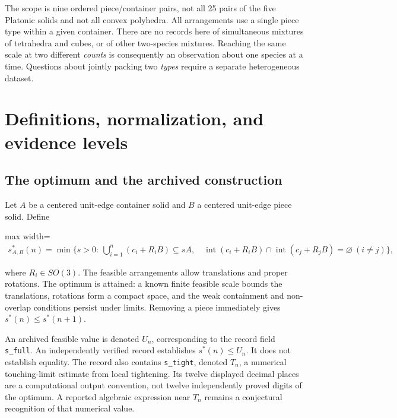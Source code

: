 \documentclass[11pt,a4paper]{article}
\begin{document}
The scope is nine ordered piece/container pairs, not all 25 pairs of the five Platonic solids and not all convex polyhedra. All arrangements use a single piece type within a given container. There are no records here of simultaneous mixtures of tetrahedra and cubes, or of other two-species mixtures. Reaching the same scale at two different \emph{counts} is consequently an observation about one species at a time. Questions about jointly packing two \emph{types} require a separate heterogeneous dataset.

\section{Definitions, normalization, and evidence levels}

\subsection{The optimum and the archived construction}

Let $A$ be a centered unit-edge container solid and $B$ a centered unit-edge piece solid. Define

\begin{center}\begin{adjustbox}{max width=\linewidth}$\displaystyle\begin{aligned}
s^*_{A,B}(n)=\min\{s>0:\ \bigcup_{i=1}^n(c_i+R_iB)\subseteq sA,
\quad \operatorname{int}(c_i+R_iB)\cap\operatorname{int}(c_j+R_jB)=\varnothing\ (i\ne j)\},
\end{aligned}$\end{adjustbox}\end{center}

where $R_i\in SO(3)$. The feasible arrangements allow translations and proper rotations. The optimum is attained: a known finite feasible scale bounds the translations, rotations form a compact space, and the weak containment and non-overlap conditions persist under limits. Removing a piece immediately gives $s^*(n)\le s^*(n+1)$.

An archived feasible value is denoted $U_n$, corresponding to the record field \nolinkurl{s_full}. An independently verified record establishes $s^*(n)\le U_n$. It does not establish equality. The record also contains \nolinkurl{s_tight}, denoted $T_n$, a numerical touching-limit estimate from local tightening. Its twelve displayed decimal places are a computational output convention, not twelve independently proved digits of the optimum. A reported algebraic expression near $T_n$ remains a conjectural recognition of that numerical value.
\end{document}
